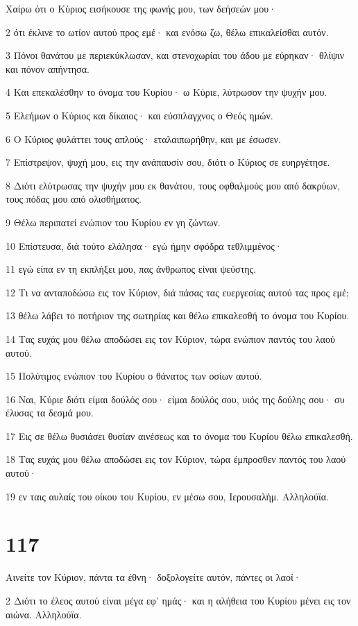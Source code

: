 \par Χαίρω ότι ο Κύριος εισήκουσε της φωνής μου, των δεήσεών μου·
\par 2 ότι έκλινε το ωτίον αυτού προς εμέ· και ενόσω ζω, θέλω επικαλείσθαι αυτόν.
\par 3 Πόνοι θανάτου με περιεκύκλωσαν, και στενοχωρίαι του άδου με εύρηκαν· θλίψιν και πόνον απήντησα.
\par 4 Και επεκαλέσθην το όνομα του Κυρίου· ω Κύριε, λύτρωσον την ψυχήν μου.
\par 5 Ελεήμων ο Κύριος και δίκαιος· και εύσπλαγχνος ο Θεός ημών.
\par 6 Ο Κύριος φυλάττει τους απλούς· εταλαιπωρήθην, και με έσωσεν.
\par 7 Επίστρεψον, ψυχή μου, εις την ανάπαυσίν σου, διότι ο Κύριος σε ευηργέτησε.
\par 8 Διότι ελύτρωσας την ψυχήν μου εκ θανάτου, τους οφθαλμούς μου από δακρύων, τους πόδας μου από ολισθήματος.
\par 9 Θέλω περιπατεί ενώπιον του Κυρίου εν γη ζώντων.
\par 10 Επίστευσα, διά τούτο ελάλησα· εγώ ήμην σφόδρα τεθλιμμένος·
\par 11 εγώ είπα εν τη εκπλήξει μου, πας άνθρωπος είναι ψεύστης.
\par 12 Τι να ανταποδώσω εις τον Κύριον, διά πάσας τας ευεργεσίας αυτού τας προς εμέ;
\par 13 θέλω λάβει το ποτήριον της σωτηρίας και θέλω επικαλεσθή το όνομα του Κυρίου.
\par 14 Τας ευχάς μου θέλω αποδώσει εις τον Κύριον, τώρα ενώπιον παντός του λαού αυτού.
\par 15 Πολύτιμος ενώπιον του Κυρίου ο θάνατος των οσίων αυτού.
\par 16 Ναι, Κύριε διότι είμαι δούλός σου· είμαι δούλός σου, υιός της δούλης σου· συ έλυσας τα δεσμά μου.
\par 17 Εις σε θέλω θυσιάσει θυσίαν αινέσεως και το όνομα του Κυρίου θέλω επικαλεσθή.
\par 18 Τας ευχάς μου θέλω αποδώσει εις τον Κύριον, τώρα έμπροσθεν παντός του λαού αυτού·
\par 19 εν ταις αυλαίς του οίκου του Κυρίου, εν μέσω σου, Ιερουσαλήμ. Αλληλούϊα.

\chapter{117}

\par Αινείτε τον Κύριον, πάντα τα έθνη· δοξολογείτε αυτόν, πάντες οι λαοί·
\par 2 Διότι το έλεος αυτού είναι μέγα εφ' ημάς· και η αλήθεια του Κυρίου μένει εις τον αιώνα. Αλληλούϊα.


